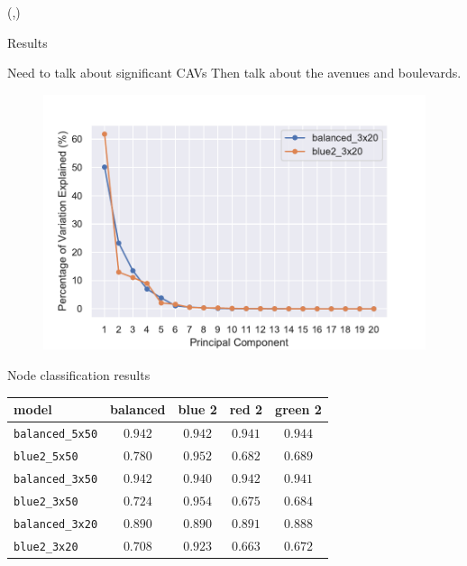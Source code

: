\documentclass[final]{beamer}
\begin{document}
\begin{frame}[fragile]{}
\begin{textblock}{\colwidth}(\thirdcolpos,\vstartCols)




\begin{paddedBlock}{Results}

\alert{Need to talk about significant CAVs}
Then talk about the avenues and boulevards.

\begin{figure}
    \centering
    \includegraphics[width=.8\textwidth]{img/scree_plot}
    \label{fig:big}
\end{figure}

\alert{Node classification results}

\begin{table}
\centering
\begin{tabular}{lcccc}
\hline

\textbf{model} &  \textbf{balanced} &   \textbf{blue 2} &    \textbf{red 2} &  \textbf{green 2} \\ \hline 
\texttt{balanced\_5x50} &    $0.942$ &  $0.942$ &  $0.941$ &  $0.944$ \\
\texttt{blue2\_5x50} &    $0.780$ &  $0.952$ &  $0.682$ &  $0.689$ \\
\texttt{balanced\_3x50} &    $0.942$ &  $0.940$ &  $0.942$ &  $0.941$ \\
\texttt{blue2\_3x50} &    $0.724$ &  $0.954$ &  $0.675$ &  $0.684$ \\
\texttt{balanced\_3x20} &    $0.890$ &  $0.890$ &  $0.891$ &  $0.888$ \\
\texttt{blue2\_3x20} &    $0.708$ &  $0.923$ &  $0.663$ &  $0.672$ \\
\hline


\end{tabular}
\end{table}
\end{paddedBlock}
\end{textblock}
\end{frame}
\end{document}

